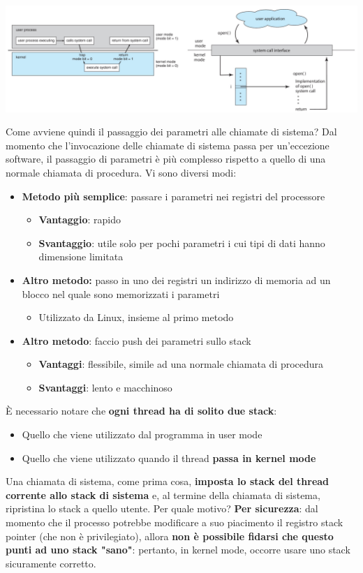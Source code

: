 \documentclass[12pt]{article}
\begin{document}
\begin{center}
    \includegraphics[width = 1\linewidth]{Images/34.png}
\end{center}
Come avviene quindi il passaggio dei parametri alle chiamate di sistema? Dal momento che l'invocazione delle chiamate di sistema passa per un'eccezione software,
il passaggio di parametri è più complesso rispetto a quello di una normale chiamata di procedura. Vi sono diversi modi:
\begin{itemize}
    \item \textbf{Metodo più semplice}: passare i parametri nei registri del processore
    \begin{itemize}
        \item \textbf{Vantaggio}: rapido
        \item \textbf{Svantaggio}: utile solo per pochi parametri i cui tipi di dati hanno dimensione limitata
    \end{itemize}
    \item \textbf{Altro metodo:} passo in uno dei registri un indirizzo di memoria ad un blocco nel quale sono memorizzati i parametri
    \begin{itemize}
        \item Utilizzato da Linux, insieme al primo metodo
    \end{itemize}
    \item \textbf{Altro metodo}: faccio push dei parametri sullo stack
    \begin{itemize}
        \item \textbf{Vantaggi}: flessibile, simile ad una normale chiamata di procedura
        \item \textbf{Svantaggi}: lento e macchinoso
    \end{itemize}
\end{itemize}
È necessario notare che \textbf{ogni thread ha di solito due stack}:
\begin{itemize}
    \item Quello che viene utilizzato dal programma in user mode
    \item Quello che viene utilizzato quando il thread \textbf{passa in kernel mode}
\end{itemize}
Una chiamata di sistema, come prima cosa, \textbf{imposta lo stack del thread corrente allo stack di sistema} e, al termine della chiamata di sistema, ripristina lo stack a quello utente.
Per quale motivo? \textbf{Per sicurezza}: dal momento che il processo potrebbe modificare a suo piacimento il registro stack pointer (che non è privilegiato), allora \textbf{non è possibile fidarsi che questo punti ad uno stack "sano"}:
pertanto, in kernel mode, occorre usare uno stack sicuramente corretto.
\end{document}
